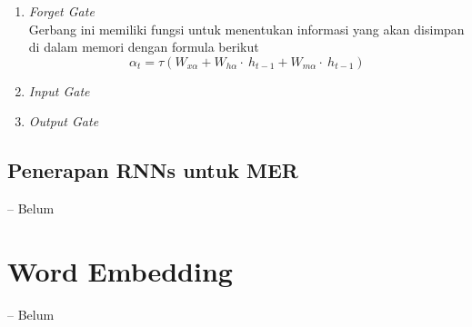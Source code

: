 \begin{enumerate}
	\item \textit{Forget Gate}\\
	Gerbang ini memiliki fungsi untuk menentukan informasi yang akan disimpan di dalam memori dengan formula berikut
	\begin{equation}\label{eq:forget_lstm}
	\alpha_{t}=\tau(W_{x\alpha}+W_{h\alpha}\cdot~h_{t-1}+W_{m\alpha}\cdot~h_{t-1})
	\end{equation}
	
	\item \textit{Input Gate}
	
	\item \textit{Output Gate}
\end{enumerate}
\subsection{Penerapan RNNs untuk MER}
-- Belum

\section{Word Embedding}
-- Belum
